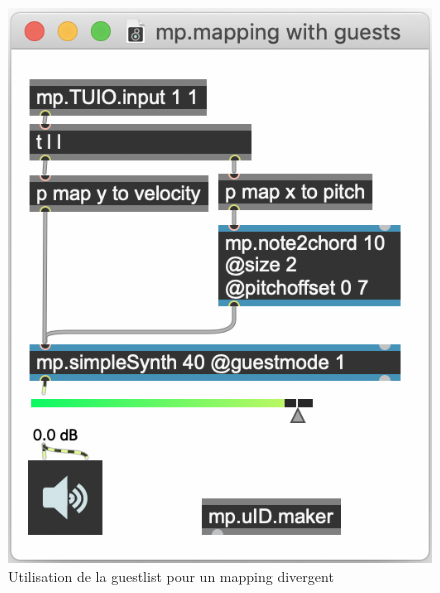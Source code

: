 \begin{figure}[!htbp]
	\captionsetup{format=plain}%
	\centering
	\begin{minipage}[t]{0.38\textwidth}
		\includegraphics[width=\linewidth]{gfx/04_algorithms/MP-mappingGuest.png}
		\caption[Exemple de patch MP : guestlist]{Utilisation de la guestlist pour un mapping divergent}
		\label{fig:algorithms:MP-mappingDivergent}
	\end{minipage}
	\hspace{.01\linewidth}
	\begin{minipage}[t]{0.58\textwidth}

\end{minipage}
\end{figure}
